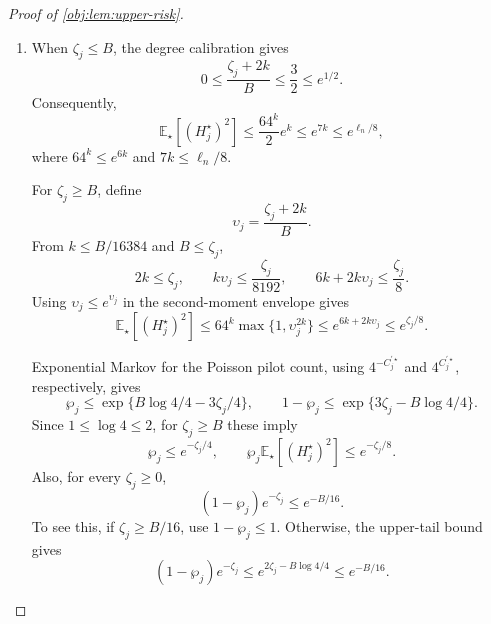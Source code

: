 \begin{proof}[Proof of \cref{obj:lem:upper-risk}]
\begin{enumerate}
On observed-law support, \(0\le U_j^\star\le C_j^\star\), and
\[
|(U_j^\star-C_j^\star/2)(C_j^\star-1)_{v-1}|
\le\frac{(C_j^\star)_v}{2}
\le\frac{(C_j^\star)^v}{2}.
\]
For every \(z\ge0\) and \(1\le v\le k\),
\[
(z/B)^v\le\max\{1,(z/B)^k\}.
\]
The coefficient bound therefore gives the pointwise envelope
\[
(H_j^\star)^2
\le\frac{64^k}{4}
\max\left\{1,\left(\frac{C_j^\star}{B}\right)^{2k}\right\}
\le\frac{64^k}{4}
\left\{1+\left(\frac{C_j^\star}{B}\right)^{2k}\right\}.
\]
For an integer \(v\ge0\), expansion of an ordinary Poisson moment into factorial moments gives
\[
\mathbb E_\star[(C_j^\star)^v]
=\sum_{t=0}^v {v\brace t}\zeta_j^t
\le\sum_{t=0}^v\binom vt v^{\,v-t}\zeta_j^t
=(\zeta_j+v)^v.
\]
Here \({v\brace t}\) counts partitions into \(t\) nonempty blocks: choosing one representative per block and assigning the remaining elements gives
\({v\brace t}\le\binom vt v^{v-t}\). The case \(v=0\) uses the constant zeroth moment. Integrating the pointwise envelope yields
\[
\mathbb E_\star[(H_j^\star)^2]
\le\frac{64^k}{4}
\left\{1+\left(\frac{\zeta_j+2k}{B}\right)^{2k}\right\}
\le\frac{64^k}{2}
\max\left\{1,\left(\frac{\zeta_j+2k}{B}\right)^{2k}\right\}.
\]

\item When \(\zeta_j\le B\), the degree calibration gives
\[
0\le\frac{\zeta_j+2k}{B}\le\frac32\le e^{1/2}.
\]
Consequently,
\[
\mathbb E_\star[(H_j^\star)^2]
\le\frac{64^k}{2}e^k
\le e^{7k}
\le e^{\ell_n/8},
\]
where \(64^k\le e^{6k}\) and \(7k\le\ell_n/8\).

For \(\zeta_j\ge B\), define
\[
\upsilon_j=\frac{\zeta_j+2k}{B}.
\]
From \(k\le B/16384\) and \(B\le\zeta_j\),
\[
2k\le\zeta_j,\qquad
k\upsilon_j\le\frac{\zeta_j}{8192},
\qquad
6k+2k\upsilon_j\le\frac{\zeta_j}{8}.
\]
Using \(\upsilon_j\le e^{\upsilon_j}\) in the second-moment envelope gives
\[
\mathbb E_\star[(H_j^\star)^2]
\le
64^k\max\{1,\upsilon_j^{2k}\}
\le e^{6k+2k\upsilon_j}
\le e^{\zeta_j/8}.
\]

Exponential Markov for the Poisson pilot count, using \(4^{-C_j^{\prime\star}}\) and \(4^{C_j^{\prime\star}}\), respectively, gives
\[
\wp_j\le
\exp\{B\log4/4-3\zeta_j/4\},
\qquad
1-\wp_j\le
\exp\{3\zeta_j-B\log4/4\}.
\]
Since \(1\le\log4\le2\), for \(\zeta_j\ge B\) these imply
\[
\wp_j\le e^{-\zeta_j/4},
\qquad
\wp_j\mathbb E_\star[(H_j^\star)^2]
\le e^{-\zeta_j/8}.
\]
Also, for every \(\zeta_j\ge0\),
\[
(1-\wp_j)e^{-\zeta_j}\le e^{-B/16}.
\]
To see this, if \(\zeta_j\ge B/16\), use \(1-\wp_j\le1\). Otherwise, the upper-tail bound gives
\[
(1-\wp_j)e^{-\zeta_j}
\le e^{2\zeta_j-B\log4/4}
\le e^{-B/16}.
\]


\end{enumerate}
\end{proof}
